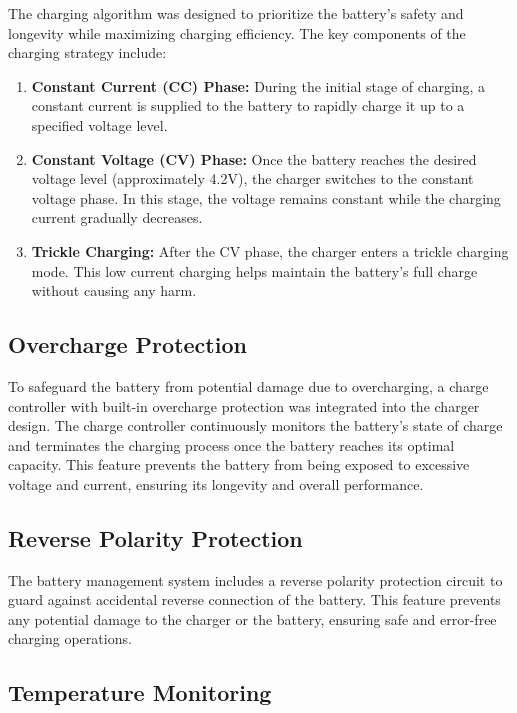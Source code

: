 \documentclass[twocolumn]{article}
\begin{document}
The charging algorithm was designed to prioritize the battery's safety and longevity while maximizing charging efficiency. The key components of the charging strategy include:

\begin{enumerate}
  \item \textbf{Constant Current (CC) Phase:} During the initial stage of charging, a constant current is supplied to the battery to rapidly charge it up to a specified voltage level.

  \item \textbf{Constant Voltage (CV) Phase:} Once the battery reaches the desired voltage level (approximately 4.2V), the charger switches to the constant voltage phase. In this stage, the voltage remains constant while the charging current gradually decreases.

  \item \textbf{Trickle Charging:} After the CV phase, the charger enters a trickle charging mode. This low current charging helps maintain the battery's full charge without causing any harm.

\end{enumerate}

\subsection*{Overcharge Protection}

To safeguard the battery from potential damage due to overcharging, a charge controller with built-in overcharge protection was integrated into the charger design. The charge controller continuously monitors the battery's state of charge and terminates the charging process once the battery reaches its optimal capacity. This feature prevents the battery from being exposed to excessive voltage and current, ensuring its longevity and overall performance.

\subsection*{Reverse Polarity Protection}

The battery management system includes a reverse polarity protection circuit to guard against accidental reverse connection of the battery. This feature prevents any potential damage to the charger or the battery, ensuring safe and error-free charging operations.

\subsection*{Temperature Monitoring}
\end{document}
